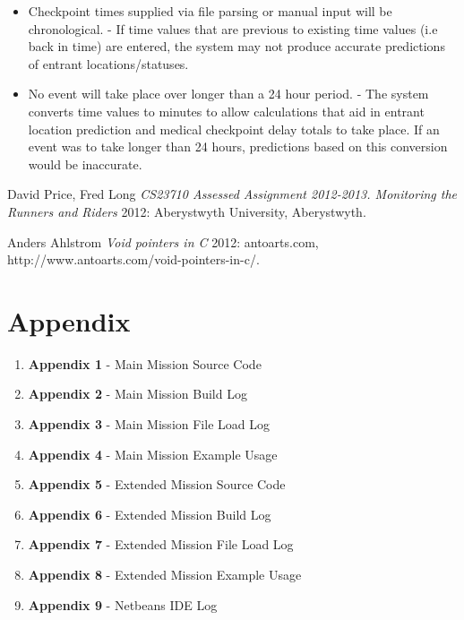 \documentclass{article}
\begin{document}
\begin{itemize}

\item Checkpoint times supplied via file parsing or manual input will be chronological. - If time values that are previous to existing time values (i.e back in time) are entered, the system may not produce accurate predictions of entrant locations/statuses.

\item No event will take place over longer than a 24 hour period. - The system converts time values to minutes to allow calculations that aid in entrant location prediction and medical checkpoint delay totals to take place. If an event was to take longer than 24 hours, predictions based on this conversion would be inaccurate.

\end{itemize}

\clearpage 



  \begin{thebibliography}{1}

   David Price, Fred Long {\em CS23710 Assessed Assignment 2012-2013. Monitoring the Runners and Riders}  2012: Aberystwyth University, Aberystwyth.

    Anders Ahlstrom {\em Void pointers in C}  2012: antoarts.com, http://www.antoarts.com/void-pointers-in-c/.

  \end{thebibliography}
  
\section*{Appendix}

\begin{enumerate}
  \item \textbf{Appendix 1} - Main Mission Source Code
  \item \textbf{Appendix 2} - Main Mission Build Log
  \item \textbf{Appendix 3} - Main Mission File Load Log
  \item \textbf{Appendix 4} - Main Mission Example Usage
  \item \textbf{Appendix 5} - Extended Mission Source Code
  \item \textbf{Appendix 6} - Extended Mission Build Log
  \item \textbf{Appendix 7} - Extended Mission File Load Log
  \item \textbf{Appendix 8} - Extended Mission Example Usage
  \item \textbf{Appendix 9} - Netbeans IDE Log
\end{enumerate}
\end{document}

